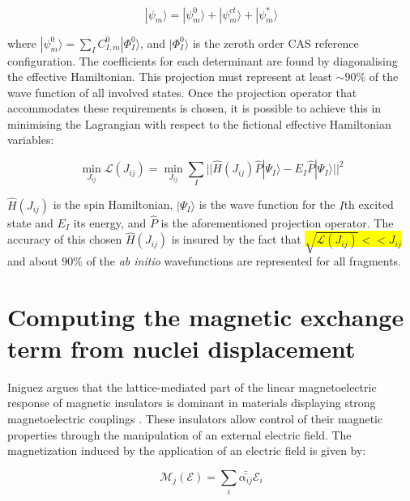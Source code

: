 \documentclass[10pt]{article}
\newcommand{\hilight}[1]{\colorbox{yellow}{#1}}
\begin{document}
\begin{equation*}
	|\psi_m\rangle = |\psi^0_m\rangle + |\psi^{ct}_m\rangle + |\psi^*_m\rangle
\end{equation*}

where $|\psi^0_m\rangle = \sum_{I}C^0_{I,m}|\Phi^0_I\rangle$, and $|\Phi^0_I\rangle$ is the zeroth order CAS reference configuration. The coefficients for each determinant are found by diagonalising the effective Hamiltonian. This projection must represent at least $\sim90\%$ of the wave function of all involved states. Once the projection operator that accommodates these requirements is chosen, it is possible to achieve this in minimising the Lagrangian with respect to the fictional effective Hamiltonian variables:

\begin{equation*}
	\min_{J_{ij}} \mathcal{L}(J_{ij}) = \min_{J_{ij}} \sum_I ||\hat{H}(J_{ij})\hat{P}|\Psi_I\rangle-E_I\hat{P}|\Psi_I\rangle||^2
\end{equation*}

$\hat{H}(J_{ij})$ is the spin Hamiltonian, $|\Psi_I\rangle$ is the wave function for the $I$th excited state and $E_I$ its energy, and $\hat{P}$ is the aforementioned projection operator. The accuracy of this chosen $\hat{H}(J_{ij})$ is insured by the fact that \hilight{$\sqrt{\mathcal{L}(J_{ij})} << J_{ij}$} and about $90\%$ of the \textit{ab initio} wavefunctions are represented for all fragments.

\section{Computing the magnetic exchange term from nuclei displacement}

Iniguez argues that the lattice-mediated part of the linear magnetoelectric response of magnetic insulators is dominant in materials displaying strong magnetoelectric couplings \cite{iniguez2008first}. These insulators allow control of their magnetic properties through the manipulation of an external electric field. The magnetization induced by the application of an electric field is given by:

\begin{equation*}
	\mathcal{M}_j(\mathcal{E}) = \sum_i \bar{\bar{\alpha_{ij}}}\mathcal{E}_i
\end{equation*}
\end{document}
